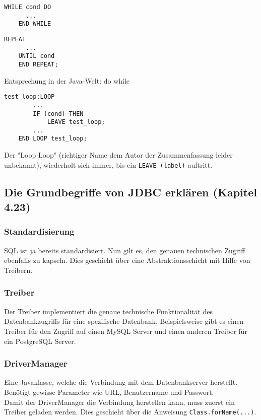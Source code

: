 \begin{lstlisting}[caption={While Loop},label=lst:loops_while]
    WHILE cond DO
      ...
    END WHILE
\end{lstlisting}

\begin{lstlisting}[caption={Repeat / Until},label=lst:loops_repeatuntil]
    REPEAT
      ...
    UNTIL cond
    END REPEAT;
\end{lstlisting}
Entsprechung in der Java-Welt: do while
\begin{lstlisting}[caption={Loop Loop},label=lst:loops_loop]
    test_loop:LOOP
        ...
        IF (cond) THEN
            LEAVE test_loop;
        ...
    END LOOP test_loop;
\end{lstlisting}
Der "Loop Loop" (richtiger Name dem Autor der Zusammenfassung leider unbekannt), wiederholt sich immer, bis ein \verb|LEAVE (label)| auftritt.

\subsection{Die Grundbegriffe von JDBC erklären (Kapitel 4.23)}

\subsubsection{Standardisierung}

SQL ist ja bereits standardisiert. Nun gilt es, den genauen technischen Zugriff ebenfalls zu kapseln. Dies geschieht über eine Abstraktionsschicht mit Hilfe von Treibern.

\subsubsection{Treiber}
Der Treiber implementiert die genaue technische Funktionalität des Datenbankzugriffs für eine spezifische Datenbank. Beispielsweise gibt es einen Treiber für den Zugriff auf einen MySQL Server und einen anderen Treiber für ein PostgreSQL Server.

\subsubsection{DriverManager}
Eine Javaklasse, welche die Verbindung mit dem Datenbankserver herstellt. Benötigt gewisse Parameter wie URL, Benutzername und Passwort. \\
Damit der DriverManager die Verbindung herstellen kann, muss zuerst ein Treiber geladen werden. Dies geschieht über die Anweisung \verb|Class.forName(...)|.

